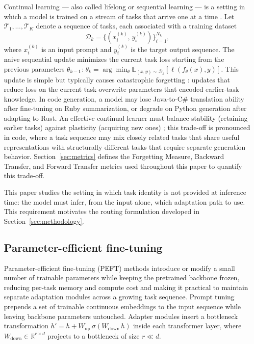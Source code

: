 Continual learning --- also called lifelong or sequential learning --- is a setting in which a model is trained on a stream of tasks that arrive one at a time \citep{parisi2019continual,delange2021continual}. Let $\mathcal{T}_1,\ldots,\mathcal{T}_K$ denote a sequence of tasks, each associated with a training dataset
\begin{equation}
    \mathcal{D}_k = \bigl\{(x_i^{(k)},\, y_i^{(k)})\bigr\}_{i=1}^{N_k},
    \label{eq:dataset}
\end{equation}
where $x_i^{(k)}$ is an input prompt and $y_i^{(k)}$ is the target output sequence. The naive sequential update minimizes the current task loss starting from the previous parameters $\theta_{k-1}$: $\theta_k = \arg\min_{\theta}\mathbb{E}_{(x,y)\sim\mathcal{D}_k}[\ell(f_\theta(x),y)]$. This update is simple but typically causes catastrophic forgetting \citep{mccloskey1989catastrophic,kirkpatrick2017overcoming}: updates that reduce loss on the current task overwrite parameters that encoded earlier-task knowledge. In code generation, a model may lose Java-to-C\# translation ability after fine-tuning on Ruby summarization, or degrade on Python generation after adapting to Rust. An effective continual learner must balance stability (retaining earlier tasks) against plasticity (acquiring new ones) \citep{delange2021continual}; this trade-off is pronounced in code, where a task sequence may mix closely related tasks that share useful representations with structurally different tasks that require separate generation behavior. Section~\ref{sec:metrics} defines the Forgetting Measure, Backward Transfer, and Forward Transfer metrics used throughout this paper to quantify this trade-off.

This paper studies the setting in which task identity is not provided at inference time: the model must infer, from the input alone, which adaptation path to use. This requirement motivates the routing formulation developed in Section~\ref{sec:methodology}.

\subsection{Parameter-efficient fine-tuning}
\label{sec:peft_background}

Parameter-efficient fine-tuning (PEFT) methods introduce or modify a small number of trainable parameters while keeping the pretrained backbone frozen, reducing per-task memory and compute cost and making it practical to maintain separate adaptation modules across a growing task sequence. Prompt tuning \citep{lester2021power} prepends a set of trainable continuous embeddings to the input sequence while leaving backbone parameters untouched. Adapter modules \citep{houlsby2019parameter} insert a bottleneck transformation $h' = h + W_{\mathrm{up}}\,\sigma(W_{\mathrm{down}}\,h)$ inside each transformer layer, where $W_{\mathrm{down}}\in\mathbb{R}^{r\times d}$ projects to a bottleneck of size $r\ll d$.

